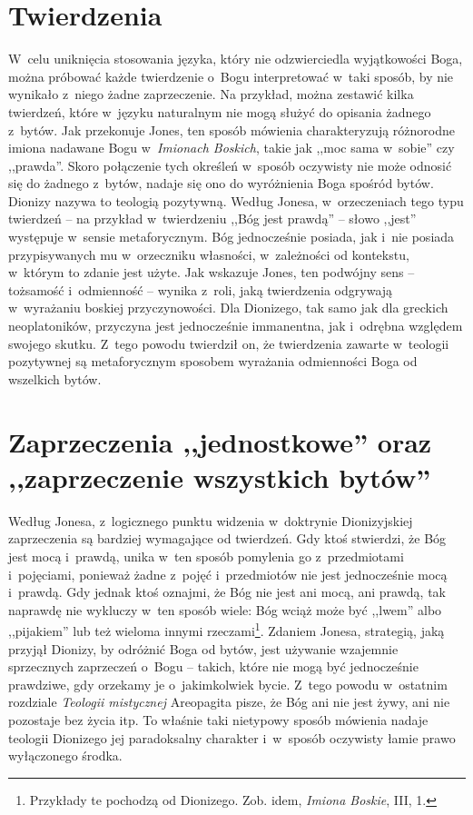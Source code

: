 \section{Twierdzenia}

W~celu uniknięcia stosowania języka, który nie odzwierciedla wyjątkowości Boga, można próbować każde twierdzenie o~Bogu interpretować w~taki sposób, by nie wynikało z~niego żadne zaprzeczenie. Na przykład, można zestawić kilka twierdzeń, które w~języku naturalnym nie mogą służyć do opisania żadnego z~bytów. Jak przekonuje Jones, ten sposób mówienia charakteryzują różnorodne imiona nadawane Bogu w~\textit{Imionach Boskich}, takie jak ,,moc sama w~sobie'' czy ,,prawda''. Skoro połączenie tych określeń w~sposób oczywisty nie może odnosić się do żadnego z~bytów, nadaje się ono do wyróżnienia Boga spośród bytów. Dionizy nazywa to teologią pozytywną. Według Jonesa, w~orzeczeniach tego typu twierdzeń -- na przykład w~twierdzeniu ,,Bóg jest prawdą'' -- słowo ,,jest'' występuje w~sensie metaforycznym. Bóg jednocześnie posiada, jak i~nie posiada przypisywanych mu w~orzeczniku własności, w~zależności od kontekstu, w~którym to zdanie jest użyte. Jak wskazuje Jones, ten podwójny sens -- tożsamość i~odmienność -- wynika z~roli, jaką twierdzenia odgrywają w~wyrażaniu boskiej przyczynowości. Dla Dionizego, tak samo jak dla greckich neoplatoników, przyczyna jest jednocześnie immanentna, jak i~odrębna względem swojego skutku. Z~tego powodu twierdził on, że twierdzenia zawarte w~teologii pozytywnej są metaforycznym sposobem wyrażania odmienności Boga od wszelkich bytów.


\section{Zaprzeczenia ,,jednostkowe'' oraz ,,zaprzeczenie wszystkich bytów''}

Według Jonesa, z~logicznego punktu widzenia w~doktrynie Dionizyjskiej zaprzeczenia są bardziej wymagające od twierdzeń. Gdy ktoś stwierdzi, że Bóg jest mocą i~prawdą, unika w~ten sposób pomylenia go z~przedmiotami i~pojęciami, ponieważ żadne z~pojęć i~przedmiotów nie jest jednocześnie mocą i~prawdą. Gdy jednak ktoś oznajmi, że Bóg nie jest ani mocą, ani prawdą, tak naprawdę nie wykluczy w~ten sposób wiele: Bóg wciąż może być ,,lwem'' albo ,,pijakiem'' lub też wieloma innymi rzeczami\footnote{Przykłady te pochodzą od Dionizego. Zob. idem, \textit{Imiona Boskie}, III, 1.}. Zdaniem Jonesa, strategią, jaką przyjął Dionizy, by odróżnić Boga od bytów, jest używanie wzajemnie sprzecznych zaprzeczeń o~Bogu -- takich, które nie mogą być jednocześnie prawdziwe, gdy orzekamy je o~jakimkolwiek bycie. Z~tego powodu w~ostatnim rozdziale \textit{Teologii mistycznej} Areopagita pisze, że Bóg ani nie jest żywy, ani nie pozostaje bez życia itp. To właśnie taki nietypowy sposób mówienia nadaje teologii Dionizego jej paradoksalny charakter i~w~sposób oczywisty łamie prawo wyłączonego środka.

